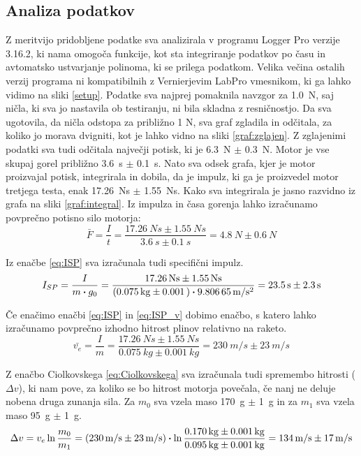 \documentclass[titlepage, a4paper, twoside, final, 12pt]{article}
\begin{document}
		\subsection{Analiza podatkov}
		Z meritvijo pridobljene podatke sva analizirala v programu Logger Pro verzije 3.16.2, ki nama omogoča funkcije, kot sta integriranje podatkov po času in
		avtomatsko ustvarjanje polinoma, ki se prilega podatkom. Velika večina ostalih verzij programa ni kompatibilnih z Vernierjevim LabPro vmesnikom, ki ga lahko vidimo na sliki \ref{setup}.
		Podatke sva najprej pomaknila navzgor za \SI{1,0}{N}, saj ničla, ki sva jo nastavila ob testiranju, ni bila skladna z resničnostjo.
		Da sva ugotovila, da ničla odstopa za približno 1 N, sva graf zgladila in odčitala, za koliko jo morava dvigniti, kot je lahko vidno na sliki \ref{graf:zglajen}.
		Z zglajenimi podatki sva tudi odčitala največji potisk, ki je \SI{6,3}{N} $\pm$ \SI{0,3}{N}. Motor je vse skupaj gorel približno \SI{3,6}{s} $\pm$ \SI{0,1}{s}.
		Nato sva odsek grafa, kjer je motor proizvajal potisk, integrirala in dobila, da je impulz, ki ga je proizvedel motor tretjega testa, enak \SI{17,26}{Ns} $\pm$ \SI{1,55}{Ns}.
		Kako sva integrirala je jasno razvidno iz grafa na sliki \ref{graf:integral}.
		Iz impulza in časa gorenja lahko izračunamo povprečno potisno silo motorja:
		\begin{equation}
			\bar{F} = \frac{I}{t} = \frac{\SI{17,26}{Ns} \pm \SI{1,55}{Ns}}{\SI{3,6}{s} \pm \SI{0,1}{s}} = \SI{4,8}{N} \pm \SI{0,6}{N}
		\end{equation}

		Iz enačbe \ref{eq:ISP} sva izračunala tudi specifični impulz.
		\begin{equation}
			I_{SP} = \frac{I}{m \vdot g_0} = \frac{\SI{17,26}{Ns} \pm \SI{1,55}{Ns}}{(\SI{0,075}{kg} \pm \SI{0,001}) \vdot \SI{9.80665}{m/s^2}} = \SI{23,5}{s} \pm \SI{2,3}{s}
		\end{equation}

		Če enačimo enačbi \ref{eq:ISP} in \ref{eq:ISP_v} dobimo enačbo, s katero lahko izračunamo povprečno izhodno hitrost plinov relativno na raketo.
		\begin{equation}
			\bar{v_e} = \frac{I}{m} = \frac{\SI{17,26}{Ns} \pm \SI{1,55}{Ns}}{\SI{0,075}{kg} \pm \SI{0,001}{kg}} = \SI{230}{m/s} \pm \SI{23}{m/s}
		\end{equation}

		Z enačbo Ciolkovskega \ref{eq:Ciolkovskega} sva izračunala tudi spremembo hitrosti ($\Delta v$), ki nam pove, za koliko se bo hitrost motorja povečala, če nanj ne deluje nobena druga zunanja sila.
		Za $m_0$ sva vzela maso \SI{170}{g} $\pm$ \SI{1}{g} in za $m_1$ sva vzela maso \SI{95}{g} $\pm$ \SI{1}{g}.
		\begin{equation}
			\Delta v = v_e \ln{\frac{m_0}{m_1}} = (\SI{230}{m/s} \pm \SI{23}{m/s})\vdot \ln{\frac{\SI{0,170}{kg} \pm \SI{0,001}{kg}}{\SI{0,095}{kg} \pm \SI{0,001}{kg}}} = \SI{134}{m/s} \pm \SI{17}{m/s}
		\end{equation}
\end{document}
